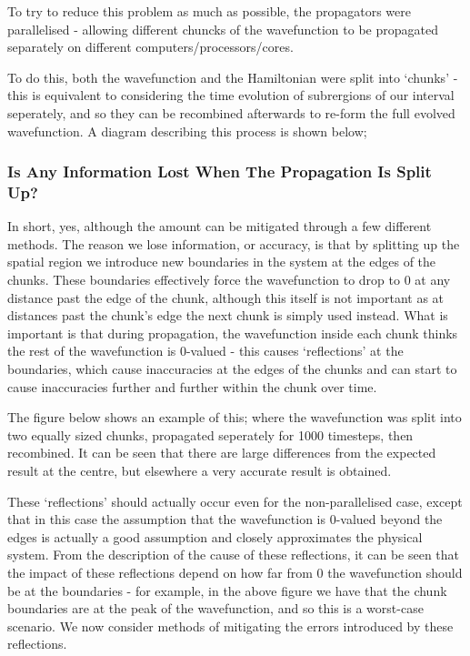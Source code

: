 To try to reduce this problem as much as possible, the propagators were parallelised - allowing different chuncks of the wavefunction to be propagated separately on different computers/processors/cores. 

To do this, both the wavefunction and the Hamiltonian were split into `chunks' - this is equivalent to considering the time evolution of subrergions of our interval seperately, and so they can be recombined afterwards to re-form the full evolved wavefunction. A diagram describing this process is shown below;



\subsubsection{Is Any Information Lost When The Propagation Is Split Up?}
In short, yes, although the amount can be mitigated through a few different methods. The reason we lose information, or accuracy, is that by splitting up the spatial region we introduce new boundaries in the system at the edges of the chunks. These boundaries effectively force the wavefunction to drop to 0 at any distance past the edge of the chunk, although this itself is not important as at distances past the chunk's edge the next chunk is simply used instead. What is important is that during propagation, the wavefunction inside each chunk thinks the rest of the wavefunction is 0-valued - this causes `reflections' at the boundaries, which cause inaccuracies at the edges of the chunks and can start to cause inaccuracies further and further within the chunk over time. 

The figure below shows an example of this; where the wavefunction was split into two equally sized chunks, propagated seperately for 1000 timesteps, then recombined. It can be seen that there are large differences from the expected result at the centre, but elsewhere a very accurate result is obtained.



These `reflections' should actually occur even for the non-parallelised case, except that in this case the assumption that the wavefunction is 0-valued beyond the edges is actually a good assumption and closely approximates the physical system. From the description of the cause of these reflections, it can be seen that the impact of these reflections depend on how far from 0 the wavefunction should be at the boundaries - for example, in the above figure we have that the chunk boundaries are at the peak of the wavefunction, and so this is a worst-case scenario. We now consider methods of mitigating the errors introduced by these reflections.

